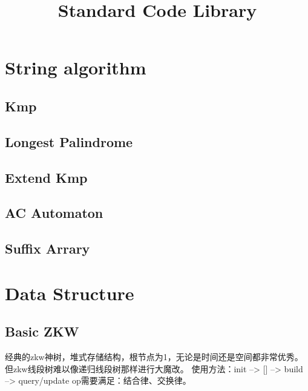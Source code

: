 \documentclass[twoside, UTF8]{article}
\title{Standard Code Library}
\author{}
\newcommand\blankpage{ \null\thispagestyle{empty}\addtocounter{page}{-1}\newpage }
\begin{document}
	\maketitle
	\afterpage{\blankpage}

	\newpage
	\tableofcontents

	\newpage
	\section{String algorithm}
		\subsection{Kmp}
			
		\subsection{Longest Palindrome}
			
		\subsection{Extend Kmp}
			
		\subsection{AC Automaton}
			
		\subsection{Suffix Arrary}
			
	\newpage
	\section{Data Structure}
		\subsection{Basic ZKW}
			\begin{flushleft}
				经典的zkw神树，堆式存储结构，根节点为1，无论是时间还是空间都非常优秀。
				\linebreak 但zkw线段树难以像递归线段树那样进行大魔改。
				\linebreak 使用方法：init --> [] --> build --> query/update
				\linebreak op需要满足：结合律、交换律。
			\end{flushleft}
			
\end{document}
